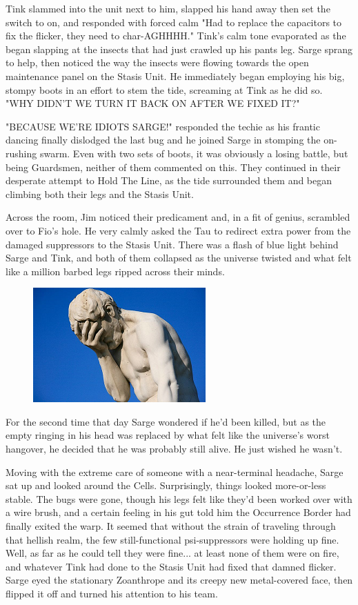 Tink slammed into the unit next to him, slapped his hand away then set the switch to on, and responded with forced calm "Had to replace the capacitors to fix the flicker, they need to char-AGHHHH." Tink's calm tone evaporated as the began slapping at the insects that had just crawled up his pants leg. 
Sarge sprang to help, then noticed the way the insects were flowing towards the open maintenance panel on the Stasis Unit. 
He immediately began employing his big, stompy boots in an effort to stem the tide, screaming at Tink as he did so. 
"WHY DIDN'T WE TURN IT BACK ON AFTER WE FIXED IT?"

"BECAUSE WE'RE IDIOTS SARGE!" responded the techie as his frantic dancing finally dislodged the last bug and he joined Sarge in stomping the on-rushing swarm. 
Even with two sets of boots, it was obviously a losing battle, but being Guardsmen, neither of them commented on this. 
They continued in their desperate attempt to Hold The Line, as the tide surrounded them and began climbing both their legs and the Stasis Unit. 


Across the room, Jim noticed their predicament and, in a fit of genius, scrambled over to Fio's hole. 
He very calmly asked the Tau to redirect extra power from the damaged suppressors to the Stasis Unit. 
There was a flash of blue light behind Sarge and Tink, and both of them collapsed as the universe twisted and what felt like a million barbed legs ripped across their minds.
\begin{figure}
	\begin{center}
		\includegraphics[width=\figwidth]{pics/13/16.png}
	\end{center}
\end{figure}
For the second time that day Sarge wondered if he'd been killed, but as the empty ringing in his head was replaced by what felt like the universe's worst hangover, he decided that he was probably still alive. 
He just wished he wasn't. 


Moving with the extreme care of someone with a near-terminal headache, Sarge sat up and looked around the Cells. 
Surprisingly, things looked more-or-less stable. 
The bugs were gone, though his legs felt like they'd been worked over with a wire brush, and a certain feeling in his gut told him the Occurrence Border had finally exited the warp. 
It seemed that without the strain of traveling through that hellish realm, the few still-functional psi-suppressors were holding up fine. 
Well, as far as he could tell they were fine... 
at least none of them were on fire, and whatever Tink had done to the Stasis Unit had fixed that damned flicker. 
Sarge eyed the stationary Zoanthrope and its creepy new metal-covered face, then flipped it off and turned his attention to his team.

